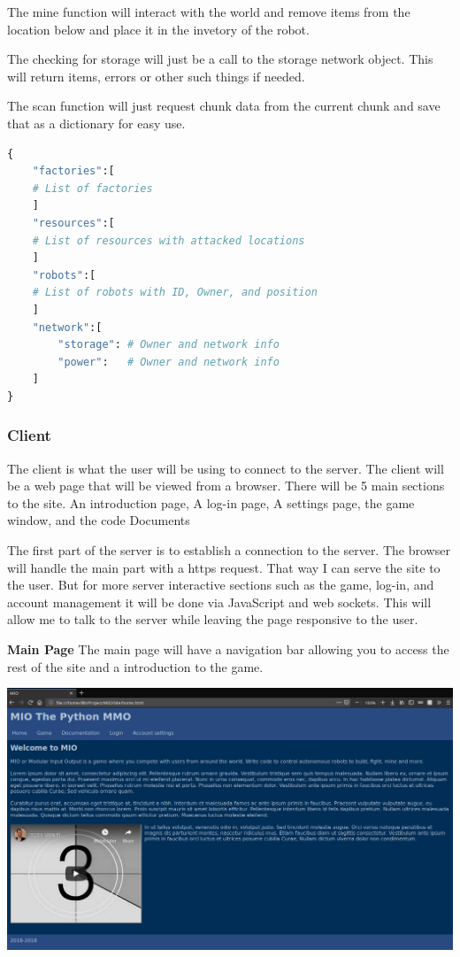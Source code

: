 \documentclass[12pt]{article}
\begin{document}
The mine function will interact with the world and remove items from the location below and place it in the invetory of the robot.

The checking for storage will just be a call to the storage network object. This will return items, errors or other such things if needed.

The scan function will just request chunk data from the current chunk and save that as a dictionary for easy use.
\begin{lstlisting}[language=Python, caption=Chunk scan return]
{
    "factories":[
    # List of factories
    ]
    "resources":[
    # List of resources with attacked locations
    ]
    "robots":[
    # List of robots with ID, Owner, and position
    ]
    "network":[
        "storage": # Owner and network info
        "power":   # Owner and network info
    ]
}
\end{lstlisting}


\subsubsection{Client}
The client is what the user will be using to connect to the server. The client will be a web page that will be viewed from a browser.
There will be 5 main sections to the site. An introduction page, A log-in page, A settings page, the game window, and the code Documents

The first part of the server is to establish a connection to the server. The browser will handle the main part with a https request. That way I can serve the site to the user. But for more server interactive sections such as the game, log-in, and account management it will be done via JavaScript and web sockets. This will allow me to talk to the server while leaving the page responsive to the user.

\textbf{Main Page}\newline
The main page will have a navigation bar allowing you to access the rest of the site and a introduction to the game. 

{\centering
\includegraphics[width=15cm]{Images/Design/homepage.png}\par
}
\end{document}

